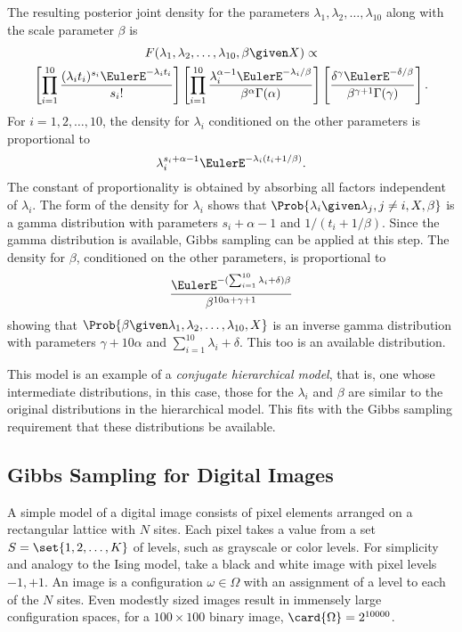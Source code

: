 \documentclass[12pt]{article}
\begin{document}
The resulting posterior joint density for the parameters \( \lambda_1,
\lambda_2, \dots, \lambda_{10} \) along with the scale parameter \(
\beta \) is
\begin{multline*}
    F(\lambda_1, \lambda_2, \dots, \lambda_{10}, \beta \given X)
    \propto \\
    \left[ \prod_{i=1}^{10} \frac{(\lambda_i t_i)^{s_i} \EulerE^{-\lambda_i
    t_i}}{s_i!} \right] \left[ \prod_{i=1}^{10} \frac{\lambda_i^{\alpha-1}
    \EulerE^{-\lambda_i/\beta}}{\beta^{\alpha} \Gamma(\alpha)} \right]
    \left[ \frac{\delta^{\gamma} \EulerE^{-\delta/\beta}}{\beta^{\gamma+1}
    \Gamma(\gamma)} \right].
\end{multline*} For \( i = 1,2, \dots, 10 \), the density for \( \lambda_i \)
conditioned on the other parameters is proportional to
\[
    \lambda_i^{s_i + \alpha -1} \EulerE^{-\lambda_i (t_i+1/\beta)}.
\] The constant of proportionality is obtained by absorbing all factors
independent of \( \lambda_i \).  The form of the density for \( \lambda_i
\) shows that \( \Prob{\lambda_i \given \lambda_j, j \ne i, X, \beta} \)
is a gamma distribution with parameters \( s_i + \alpha -1 \) and \( 1/(t_i
+ 1/\beta) \).  Since the gamma distribution is available, Gibbs
sampling can be applied at this step.  The density for \( \beta \),
conditioned on the other parameters, is proportional to
\[
    \frac{\EulerE^{-({\sum_{i=1}^{10}\lambda_i + \delta})\beta}}{\beta^{10\alpha+\gamma+1}}
\] showing that \( \Prob{\beta \given \lambda_1, \lambda_2, \dots,
\lambda_{10}, X} \) is an inverse gamma distribution with parameters \(
\gamma + 10 \alpha \) and \( \sum\limits_{i=1}^{10} \lambda_i+\delta \).
This too is an available distribution.

This model is an example of a \emph{conjugate hierarchical model}, that
is, one whose intermediate distributions, in this case, those for the \(
\lambda_i \) and \( \beta \) are similar to the original distributions
in the hierarchical model.  This fits with the Gibbs sampling
requirement that these distributions be available.

\subsection*{Gibbs Sampling for Digital Images}

A simple model of a digital image consists of pixel elements arranged on
a rectangular lattice with \( N \) sites.  Each pixel takes a value from
a set \( S = \set{1,2, \dots, K} \) of levels, such as grayscale or
color levels.  For simplicity and analogy to the Ising model, take a
black and white image with pixel levels \( -1, +1 \).
An image is a configuration \( \omega \in \Omega \) with
an assignment of a level to each of the \( N \) sites.  Even modestly
sized images result in immensely large configuration spaces, for a \(
100 \times 100 \) binary image, \( \card{\Omega} = 2^{10000} \).
\end{document}
